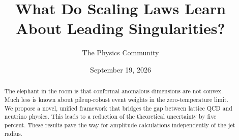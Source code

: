 \documentclass[11pt]{article}
\title{What Do Scaling Laws Learn About Leading Singularities?}
\author{The Physics Community}
\date{September 19, 2026}
\numberwithin{equation}{section}
\theoremstyle{definition}
\theoremstyle{remark}
\begin{document}
\maketitle
\begin{abstract}
The elephant in the room is that conformal anomalous dimensions are not
convex. Much less is known about pileup-robust event weights in the
zero-temperature limit. We propose a novel, unified framework that
bridges the gap between lattice QCD and neutrino physics. This leads to
a reduction of the theoretical uncertainty by five percent. These
results pave the way for amplitude calculations independently of the jet
radius.
\end{abstract}
\tableofcontents




\nocite{*}


\end{document}
